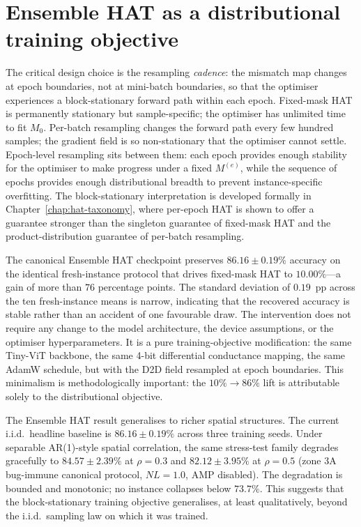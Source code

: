 \section{Ensemble HAT as a distributional training objective}
\label{sec:ch1-ensemble-hat}

The critical design choice is the resampling \emph{cadence}: the mismatch map changes at epoch boundaries, not at mini-batch boundaries, so that the optimiser experiences a block-stationary forward path within each epoch.  Fixed-mask HAT is permanently stationary but sample-specific; the optimiser has unlimited time to fit $M_{0}$.  Per-batch resampling changes the forward path every few hundred samples; the gradient field is so non-stationary that the optimiser cannot settle.  Epoch-level resampling sits between them: each epoch provides enough stability for the optimiser to make progress under a fixed $M^{(e)}$, while the sequence of epochs provides enough distributional breadth to prevent instance-specific overfitting.  The block-stationary interpretation is developed formally in Chapter~\ref{chap:hat-taxonomy}, where per-epoch HAT is shown to offer a guarantee stronger than the singleton guarantee of fixed-mask HAT and the product-distribution guarantee of per-batch resampling.

The canonical Ensemble HAT checkpoint preserves $86.16\pm0.19\%$ accuracy on the identical fresh-instance protocol that drives fixed-mask HAT to $10.00\%$---a gain of more than $76$ percentage points.  The standard deviation of $0.19$~pp across the ten fresh-instance means is narrow, indicating that the recovered accuracy is stable rather than an accident of one favourable draw.  The intervention does not require any change to the model architecture, the device assumptions, or the optimiser hyperparameters.  It is a pure training-objective modification: the same Tiny-ViT backbone, the same 4-bit differential conductance mapping, the same AdamW schedule, but with the D2D field resampled at epoch boundaries.  This minimalism is methodologically important: the $10\% \rightarrow 86\%$ lift is attributable solely to the distributional objective.

The Ensemble HAT result generalises to richer spatial structures.  The current i.i.d.~headline baseline is $86.16\pm0.19\%$ across three training seeds.  Under separable AR(1)-style spatial correlation, the same stress-test family degrades gracefully to $84.57\pm2.39\%$ at $\rho=0.3$ and $82.12\pm3.95\%$ at $\rho=0.5$ (zone 3A bug-immune canonical protocol, $NL=1.0$, AMP disabled).  The degradation is bounded and monotonic; no instance collapses below $73.7\%$.  This suggests that the block-stationary training objective generalises, at least qualitatively, beyond the i.i.d.~sampling law on which it was trained.

